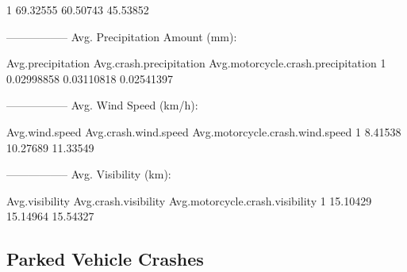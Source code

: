 \documentclass[11pt, a4paper]{article}
\begin{document}
\begin{Schunk}
\begin{Soutput}
1     69.32555           60.50743                      45.53852
\end{Soutput}
\begin{Soutput}
-----------------
Avg. Precipitation Amount (mm):
\end{Soutput}
\begin{Soutput}
  Avg.precipitation Avg.crash.precipitation Avg.motorcycle.crash.precipitation
1        0.02998858              0.03110818                         0.02541397
\end{Soutput}
\begin{Soutput}
-----------------
Avg. Wind Speed (km/h):
\end{Soutput}
\begin{Soutput}
  Avg.wind.speed Avg.crash.wind.speed Avg.motorcycle.crash.wind.speed
1        8.41538             10.27689                        11.33549
\end{Soutput}
\begin{Soutput}
-----------------
Avg. Visibility (km):
\end{Soutput}
\begin{Soutput}
  Avg.visibility Avg.crash.visibility Avg.motorcycle.crash.visibility
1       15.10429             15.14964                        15.54327
\end{Soutput}
\end{Schunk}



\pagebreak
\subsection{Parked Vehicle Crashes}
\end{document}
